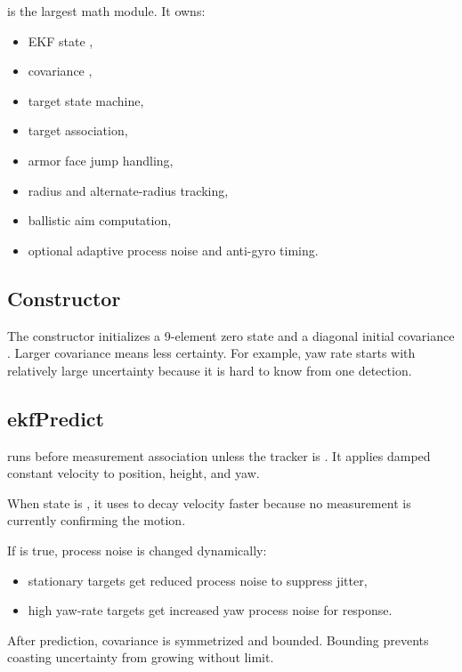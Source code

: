  is the largest math module. It owns:

\begin{itemize}
  \item EKF state ,
  \item covariance ,
  \item target state machine,
  \item target association,
  \item armor face jump handling,
  \item radius and alternate-radius tracking,
  \item ballistic aim computation,
  \item optional adaptive process noise and anti-gyro timing.
\end{itemize}

\subsection{Constructor}

The constructor initializes a 9-element zero state and a diagonal initial
covariance . Larger covariance means less certainty. For example,
yaw rate starts with relatively large uncertainty because it is hard to know
from one detection.

\subsection{ekfPredict}

 runs before measurement association unless the tracker is
. It applies damped constant velocity to position, height, and yaw.

When state is , it uses  to decay velocity
faster because no measurement is currently confirming the motion.

If  is true, process noise is changed dynamically:

\begin{itemize}
  \item stationary targets get reduced process noise to suppress jitter,
  \item high yaw-rate targets get increased yaw process noise for response.
\end{itemize}

After prediction, covariance is symmetrized and bounded. Bounding prevents
coasting uncertainty from growing without limit.

